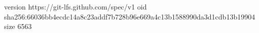version https://git-lfs.github.com/spec/v1
oid sha256:66036bb4ecdc14a8c23addf7b728b96e669a4c13b1588990da3d1cdb13b19904
size 6563
